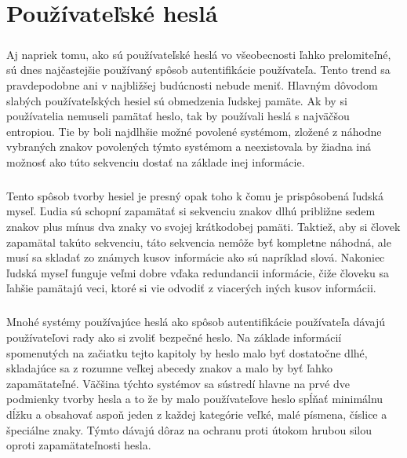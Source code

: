 \chapter{Používateľské heslá}

\paragraph{}
Aj napriek tomu, ako sú používateľské heslá vo všeobecnosti ľahko prelomiteľné, sú dnes najčastejšie používaný spôsob autentifikácie používateľa. Tento trend sa pravdepodobne ani v najbližšej budúcnosti nebude meniť. Hlavným dôvodom slabých používateľských hesiel sú obmedzenia ľudskej pamäte. Ak by si používatelia nemuseli pamätať heslo, tak by používali heslá s najväčšou entropiou. Tie by boli najdlhšie možné povolené systémom, zložené z náhodne vybraných znakov povolených týmto systémom a neexistovala by žiadna iná možnosť ako túto sekvenciu dostať na základe inej informácie.

\paragraph{}
Tento spôsob tvorby hesiel je presný opak toho k čomu je prispôsobená ľudská myseľ. Ľudia sú schopní zapamätať si sekvenciu znakov dlhú približne sedem znakov plus mínus dva znaky vo svojej krátkodobej pamäti. Taktiež, aby si človek zapamätal takúto sekvenciu, táto sekvencia nemôže byť kompletne náhodná, ale musí sa skladať zo známych kusov informácie ako sú napríklad slová. Nakoniec ľudská myseľ funguje veľmi dobre vďaka redundancii informácie, čiže človeku sa ľahšie pamätajú veci, ktoré si vie odvodiť z viacerých iných kusov informácii.

\paragraph{}
Mnohé systémy používajúce heslá ako spôsob autentifikácie používateľa dávajú používateľovi rady ako si zvoliť bezpečné heslo. Na základe informácií spomenutých na začiatku tejto kapitoly by heslo malo byť dostatočne dlhé, skladajúce sa z rozumne veľkej abecedy znakov a malo by byť ľahko zapamätateľné. Väčšina týchto systémov sa sústredí hlavne na prvé dve podmienky tvorby hesla a to že by malo používateľove heslo spĺňať minimálnu dĺžku a obsahovať aspoň jeden z každej kategórie veľké, malé písmena, číslice a špeciálne znaky. Týmto dávajú dôraz na ochranu proti útokom hrubou silou oproti zapamätateľnosti hesla.

